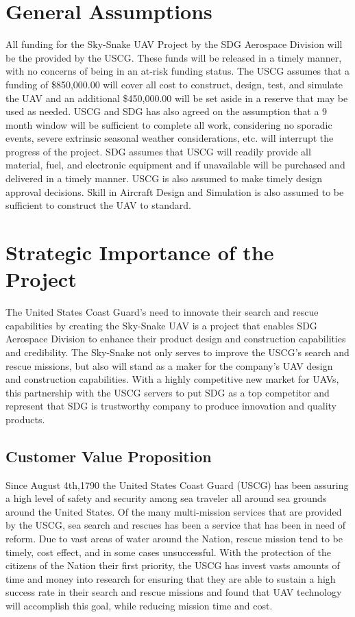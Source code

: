 \documentclass{article}
\begin{document}
\section{General Assumptions}
All funding for the Sky-Snake UAV Project by the SDG Aerospace Division will be the provided by the USCG. These funds will be released in a timely manner, with no concerns of being in an at-risk funding status. The USCG assumes that a funding of \$850,000.00 will cover all cost to construct, design, test, and simulate the UAV and an additional \$450,000.00 will be set aside in a reserve that may be used as needed. USCG and SDG has also agreed on the assumption that a 9 month window will be sufficient to complete all work, considering no sporadic events, severe extrinsic seasonal weather considerations, etc. will interrupt the progress of the project. SDG assumes that USCG will readily provide all material, fuel, and electronic equipment and if unavailable will be purchased and delivered in a timely manner. USCG is also assumed to make timely design approval decisions. Skill in Aircraft Design and Simulation is also assumed to be sufficient to construct the UAV to standard.

\section{Strategic Importance of the Project}
The United States Coast Guard’s need to innovate their search and rescue capabilities by creating the Sky-Snake UAV is a project that enables SDG Aerospace Division to enhance their product design and construction capabilities and credibility. The Sky-Snake not only serves to improve the USCG’s search and rescue missions, but also will stand as a maker for the company’s UAV design and construction capabilities. With a highly competitive new market for UAVs, this partnership with the USCG servers to put SDG as a top competitor and represent that SDG is trustworthy company to produce innovation and quality products.

\subsection{Customer Value Proposition}
Since August 4th,1790 the United States Coast Guard (USCG) has been assuring a high level of safety and security among sea traveler all around sea grounds around the United States. Of the many multi-mission services that are provided by the USCG, sea search and rescues has been a service that has been in need of reform. Due to vast areas of water around the Nation, rescue mission tend to be timely, cost effect, and in some cases unsuccessful. With the protection of the citizens of the Nation their first priority, the USCG has invest vasts amounts of time and money into research for ensuring that they are able to sustain a high success rate in their search and rescue missions and found that UAV technology will accomplish this goal, while reducing mission time and cost.
\end{document}

